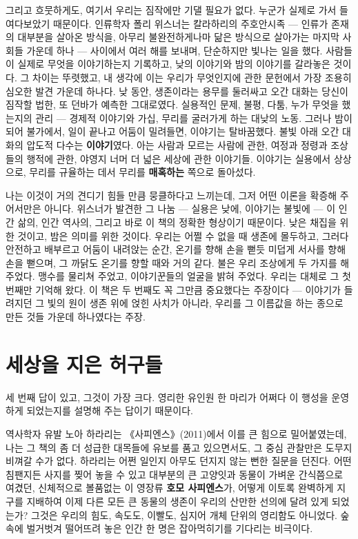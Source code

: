 그리고 흐뭇하게도, 여기서 우리는 짐작에만 기댈 필요가 없다. 누군가 실제로 가서 들여다보았기 때문이다. 인류학자 폴리 위스너는 칼라하리의 주호안시족 — 인류가 존재의 대부분을 살아온 방식을, 아무리 불완전하게나마 닮은 방식으로 살아가는 마지막 사회들 가운데 하나 — 사이에서 여러 해를 보내며, 단순하지만 빛나는 일을 했다. 사람들이 실제로 무엇을 이야기하는지 기록하고, 낮의 이야기와 밤의 이야기를 갈라놓은 것이다. 그 차이는 뚜렷했고, 내 생각에 이는 우리가 무엇인지에 관한 문헌에서 가장 조용히 심오한 발견 가운데 하나다. 낮 동안, 생존이라는 용무를 둘러싸고 오간 대화는 당신이 짐작할 법한, 또 던바가 예측한 그대로였다. 실용적인 문제, 불평, 다툼, 누가 무엇을 했는지의 관리 — 경제적 이야기와 가십, 무리를 굴러가게 하는 대낮의 노동. 그러나 밤이 되어 불가에서, 일이 끝나고 어둠이 밀려들면, 이야기는 탈바꿈했다. 불빛 아래 오간 대화의 압도적 다수는 \textbf{이야기}였다. 아는 사람과 모르는 사람에 관한, 여정과 정령과 조상들의 행적에 관한, 야영지 너머 더 넓은 세상에 관한 이야기들. 이야기는 실용에서 상상으로, 무리를 규율하는 데서 무리를 \textbf{매혹하는} 쪽으로 돌아섰다.

나는 이것이 거의 견디기 힘들 만큼 뭉클하다고 느끼는데, 그저 어떤 이론을 확증해 주어서만은 아니다. 위스너가 발견한 그 나눔 — 실용은 낮에, 이야기는 불빛에 — 이 인간 삶의, 인간 역사의, 그리고 바로 이 책의 정확한 형상이기 때문이다. 낮은 채집을 위한 것이고, 밤은 의미를 위한 것이다. 우리는 어쩔 수 없을 때 생존에 몰두하고, 그러다 안전하고 배부르고 어둠이 내려앉는 순간, 온기를 향해 손을 뻗듯 미덥게 서사를 향해 손을 뻗으며, 그 까닭도 온기를 향할 때와 거의 같다. 불은 우리 조상에게 두 가지를 해 주었다. 맹수를 물리쳐 주었고, 이야기꾼들의 얼굴을 밝혀 주었다. 우리는 대체로 그 첫 번째만 기억해 왔다. 이 책은 두 번째도 꼭 그만큼 중요했다는 주장이다 — 이야기가 들려지던 그 빛의 원이 생존 위에 얹힌 사치가 아니라, 우리를 그 이름값을 하는 종으로 만든 것들 가운데 하나였다는 주장.

\section*{세상을 지은 허구들}

세 번째 답이 있고, 그것이 가장 크다. 영리한 유인원 한 마리가 어쩌다 이 행성을 운영하게 되었는지를 설명해 주는 답이기 때문이다.

역사학자 유발 노아 하라리는 《사피엔스》(2011)에서 이를 큰 힘으로 밀어붙였는데, 나는 그 책의 좀 더 성급한 대목들에 유보를 품고 있으면서도, 그 중심 관찰만은 도무지 비껴갈 수가 없다. 하라리는 어쩐 일인지 아무도 던지지 않는 뻔한 질문을 던진다. 어떤 침팬지든 사지를 찢어 놓을 수 있고 대부분의 큰 고양잇과 동물이 가벼운 간식쯤으로 여겼던, 신체적으로 볼품없는 이 영장류 \textbf{호모 사피엔스}가, 어떻게 이토록 완벽하게 지구를 지배하여 이제 다른 모든 큰 동물의 생존이 우리의 산만한 선의에 달려 있게 되었는가? 그것은 우리의 힘도, 속도도, 이빨도, 심지어 개체 단위의 영리함도 아니었다. 숲속에 벌거벗겨 떨어뜨려 놓은 인간 한 명은 잡아먹히기를 기다리는 비극이다.

